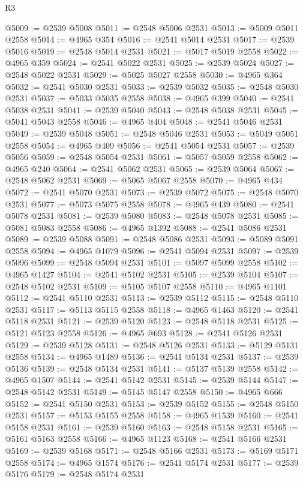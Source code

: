 \begin{lexlean}{R3}
\begin{coremodule}
@5009 := @2539 @5008
@5011 := @2548 @5006 @2531
@5013 := @5009 @5011 @2558
@5014 := @4965 @354
@5016 := @2541 @5014 @2531
@5017 := @2539 @5016
@5019 := @2548 @5014 @2531
@5021 := @5017 @5019 @2558
@5022 := @4965 @359
@5024 := @2541 @5022 @2531
@5025 := @2539 @5024
@5027 := @2548 @5022 @2531
@5029 := @5025 @5027 @2558
@5030 := @4965 @364
@5032 := @2541 @5030 @2531
@5033 := @2539 @5032
@5035 := @2548 @5030 @2531
@5037 := @5033 @5035 @2558
@5038 := @4965 @399
@5040 := @2541 @5038 @2531
@5041 := @2539 @5040
@5043 := @2548 @5038 @2531
@5045 := @5041 @5043 @2558
@5046 := @4965 @404
@5048 := @2541 @5046 @2531
@5049 := @2539 @5048
@5051 := @2548 @5046 @2531
@5053 := @5049 @5051 @2558
@5054 := @4965 @409
@5056 := @2541 @5054 @2531
@5057 := @2539 @5056
@5059 := @2548 @5054 @2531
@5061 := @5057 @5059 @2558
@5062 := @4965 @240
@5064 := @2541 @5062 @2531
@5065 := @2539 @5064
@5067 := @2548 @5062 @2531
@5069 := @5065 @5067 @2558
@5070 := @4965 @434
@5072 := @2541 @5070 @2531
@5073 := @2539 @5072
@5075 := @2548 @5070 @2531
@5077 := @5073 @5075 @2558
@5078 := @4965 @439
@5080 := @2541 @5078 @2531
@5081 := @2539 @5080
@5083 := @2548 @5078 @2531
@5085 := @5081 @5083 @2558
@5086 := @4965 @1392
@5088 := @2541 @5086 @2531
@5089 := @2539 @5088
@5091 := @2548 @5086 @2531
@5093 := @5089 @5091 @2558
@5094 := @4965 @1079
@5096 := @2541 @5094 @2531
@5097 := @2539 @5096
@5099 := @2548 @5094 @2531
@5101 := @5097 @5099 @2558
@5102 := @4965 @1427
@5104 := @2541 @5102 @2531
@5105 := @2539 @5104
@5107 := @2548 @5102 @2531
@5109 := @5105 @5107 @2558
@5110 := @4965 @1101
@5112 := @2541 @5110 @2531
@5113 := @2539 @5112
@5115 := @2548 @5110 @2531
@5117 := @5113 @5115 @2558
@5118 := @4965 @1463
@5120 := @2541 @5118 @2531
@5121 := @2539 @5120
@5123 := @2548 @5118 @2531
@5125 := @5121 @5123 @2558
@5126 := @4965 @693
@5128 := @2541 @5126 @2531
@5129 := @2539 @5128
@5131 := @2548 @5126 @2531
@5133 := @5129 @5131 @2558
@5134 := @4965 @1489
@5136 := @2541 @5134 @2531
@5137 := @2539 @5136
@5139 := @2548 @5134 @2531
@5141 := @5137 @5139 @2558
@5142 := @4965 @1507
@5144 := @2541 @5142 @2531
@5145 := @2539 @5144
@5147 := @2548 @5142 @2531
@5149 := @5145 @5147 @2558
@5150 := @4965 @666
@5152 := @2541 @5150 @2531
@5153 := @2539 @5152
@5155 := @2548 @5150 @2531
@5157 := @5153 @5155 @2558
@5158 := @4965 @1539
@5160 := @2541 @5158 @2531
@5161 := @2539 @5160
@5163 := @2548 @5158 @2531
@5165 := @5161 @5163 @2558
@5166 := @4965 @1123
@5168 := @2541 @5166 @2531
@5169 := @2539 @5168
@5171 := @2548 @5166 @2531
@5173 := @5169 @5171 @2558
@5174 := @4965 @1574
@5176 := @2541 @5174 @2531
@5177 := @2539 @5176
@5179 := @2548 @5174 @2531

\end{coremodule}
\end{lexlean}
